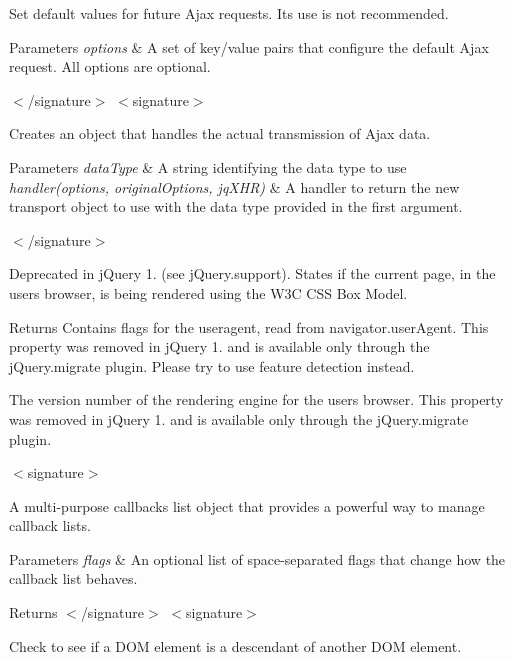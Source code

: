Set default values for future Ajax requests. Its use is not recommended.


\begin{DoxyParams}{Parameters}
{\em options} & A set of key/value pairs that configure the default Ajax request. All options are optional.\\
\hline
\end{DoxyParams}
$<$/signature$>$ $<$signature$>$ 

Creates an object that handles the actual transmission of Ajax data.


\begin{DoxyParams}{Parameters}
{\em data\+Type} & A string identifying the data type to use\\
\hline
{\em handler(options, original\+Options, jq\+X\+H\+R)} & A handler to return the new transport object to use with the data type provided in the first argument.\\
\hline
\end{DoxyParams}
$<$/signature$>$ 

Deprecated in j\+Query 1. (see j\+Query.\+support). States if the current page, in the user\textquotesingle{}s browser, is being rendered using the W3C C\+SS Box Model.

\begin{DoxyReturn}{Returns}
Contains flags for the useragent, read from navigator.\+user\+Agent. This property was removed in j\+Query 1. and is available only through the j\+Query.\+migrate plugin. Please try to use feature detection instead.

The version number of the rendering engine for the user\textquotesingle{}s browser. This property was removed in j\+Query 1. and is available only through the j\+Query.\+migrate plugin.

$<$signature$>$ 

A multi-\/purpose callbacks list object that provides a powerful way to manage callback lists.
\end{DoxyReturn}

\begin{DoxyParams}{Parameters}
{\em flags} & An optional list of space-\/separated flags that change how the callback list behaves.\\
\hline
\end{DoxyParams}
\begin{DoxyReturn}{Returns}
$<$/signature$>$ $<$signature$>$ 

Check to see if a D\+OM element is a descendant of another D\+OM element.
\end{DoxyReturn}

